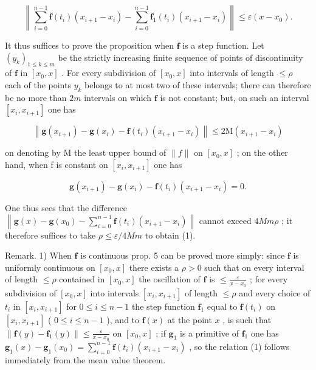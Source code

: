 \[
\left\| \sum_ {i = 0} ^ {n - 1} \mathbf {f} (t _ {i}) (x _ {i + 1} - x _ {i}) - \sum_ {i = 0} ^ {n - 1} \mathbf {f} _ {1} (t _ {i}) (x _ {i + 1} - x _ {i}) \right\| \leqslant \varepsilon (x - x _ {0}).
\]

It thus suffices to prove the proposition when \(\mathbf{f}\) is a step function. Let \((y_{k})_{1\leqslant k\leqslant m}\) be the strictly increasing finite sequence of points of discontinuity of \(\mathbf{f}\) in \([x_0, x]\) . For every subdivision of \([x_0, x]\) into intervals of length \(\leqslant \rho\) each of the points \(y_{k}\) belongs to at most two of these intervals; there can therefore be no more than \(2m\) intervals on which \(\mathbf{f}\) is not constant; but, on such an interval \([x_i, x_{i+1}]\) one has

\[
\left\| \mathbf {g} \left(x _ {i + 1}\right) - \mathbf {g} \left(x _ {i}\right) - \mathbf {f} \left(t _ {i}\right) \left(x _ {i + 1} - x _ {i}\right) \right\| \leqslant 2 \mathrm{M} \left(x _ {i + 1} - x _ {i}\right)
\]

on denoting by M the least upper bound of \(\|f\|\) on \([x_{0}, x]\) ; on the other hand, when f is constant on \([x_{i}, x_{i+1}]\) one has

\[
\mathbf {g} (x _ {i + 1}) - \mathbf {g} (x _ {i}) - \mathbf {f} (t _ {i}) (x _ {i + 1} - x _ {i}) = 0.
\]

One thus sees that the difference \(\left\|\mathbf{g}(x)-\mathbf{g}(x_{0})-\sum_{i=0}^{n-1}\mathbf{f}(t_{i})(x_{i+1}-x_{i})\right\|\) cannot exceed \(4Mm\rho\) ; it therefore suffices to take \(\rho\leqslant\varepsilon/4Mm\) to obtain (1).

Remark. 1) When \(\mathbf{f}\) is continuous prop. 5 can be proved more simply: since \(\mathbf{f}\) is uniformly continuous on \([x_0, x]\) there exists a \(\rho > 0\) such that on every interval of length \(\leqslant \rho\) contained in \([x_0, x]\) the oscillation of \(\mathbf{f}\) is \(\leqslant \frac{\varepsilon}{x - x_0}\) ; for every subdivision of \([x_0, x]\) into intervals \([x_i, x_{i+1}]\) of length \(\leqslant \rho\) and every choice of \(t_i\) in \([x_i, x_{i+1}]\) for \(0 \leqslant i \leqslant n-1\) the step function \(\mathbf{f}_1\) equal to \(\mathbf{f}(t_i)\) on \([x_i, x_{i+1}]\) ( \(0 \leqslant i \leqslant n-1\) ), and to \(\mathbf{f}(x)\) at the point \(x\) , is such that \(\| \mathbf{f}(y) - \mathbf{f}_1(y)\| \leqslant \frac{\varepsilon}{x - x_0}\) on \([x_0, x]\) ; if \(\mathbf{g}_1\) is a primitive of \(\mathbf{f}_1\) one has \(\mathbf{g}_1(x) - \mathbf{g}_1(x_0) = \sum_{i=0}^{n-1} \mathbf{f}(t_i)(x_{i+1} - x_i)\) , so the relation (1) follows immediately from the mean value theorem.

